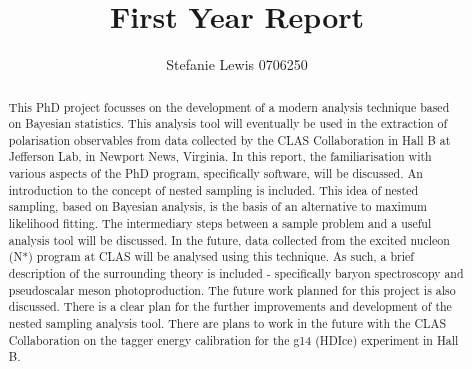 \documentclass[a4paper,12pt]{article}
\title{First Year Report}
\author{Stefanie Lewis 0706250}
\begin{document}
\maketitle

\begin{abstract}
This PhD project focusses on the development of a modern analysis technique based on Bayesian statistics.  This analysis tool will eventually be used in the extraction of polarisation observables from data collected by the CLAS Collaboration in Hall B at Jefferson Lab, in Newport News, Virginia.  In this report, the familiarisation with various aspects of the PhD program, specifically software, will be discussed.  An introduction to the concept of nested sampling is included.  This idea of nested sampling, based on Bayesian analysis, is the basis of an alternative to maximum likelihood fitting.  The intermediary steps between a sample problem and a useful analysis tool will be discussed.  In the future, data collected from the excited nucleon (N*) program at CLAS will be analysed using this technique.  As such, a brief description of the surrounding theory is included - specifically baryon spectroscopy and pseudoscalar meson photoproduction.  The future work planned for this project is also discussed.  There is a clear plan for the further improvements and development of the nested sampling analysis tool.  There are plans to work in the future with the CLAS Collaboration on the tagger energy calibration for the g14 (HDIce) experiment in Hall B.  
\end{abstract}

\newpage
\tableofcontents

\newpage
\end{document}
